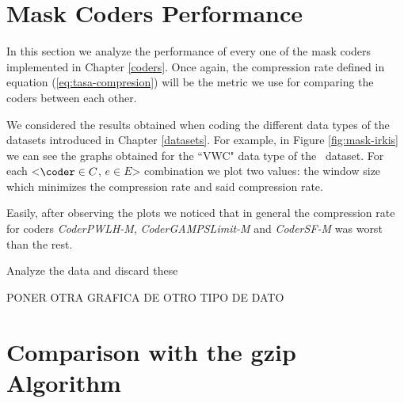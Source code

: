 











\clearpage
\section{Mask Coders Performance}
\label{secX:codersmask}

In this section we analyze the performance of every one of the mask coders implemented in Chapter \ref{coders}. Once again, the compression rate defined in equation (\ref{eq:tasa-compresion}) will be the metric we use for comparing the coders between each other.

We considered the results obtained when coding the different data types of the datasets introduced in Chapter \ref{datasets}. For example, in Figure \ref{fig:mask-irkis} we can see the graphs obtained for the ``VWC" data type of the \datasetirkis \ dataset. For each <$\coder \in C$, $e \in E$> combination we plot two values: the window size which minimizes the compression rate and said compression rate.

Easily, after observing the plots we noticed that in general the compression rate for coders \textit{CoderPWLH-M}, \textit{CoderGAMPSLimit-M} and \textit{CoderSF-M} was worst than the rest.

Analyze the data and discard these 

PONER OTRA GRAFICA DE OTRO TIPO DE DATO

\clearpage

\clearpage







\clearpage
\section{Comparison with the gzip Algorithm}
\label{secX:gzip}